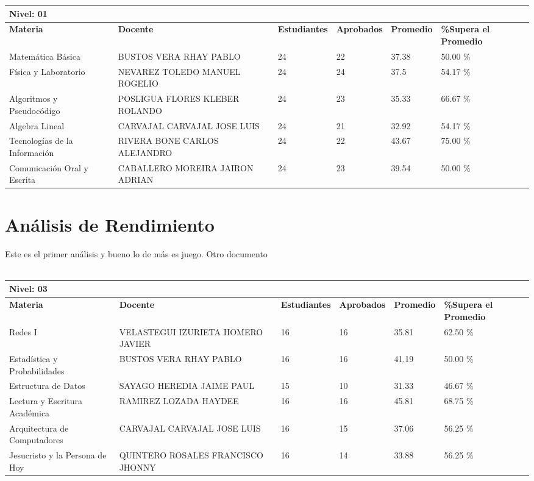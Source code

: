 \small
\begin{tabularx}{\textwidth}{|p{2.5cm}|p{2.5cm}|X|X|X|X|}
\hline
\multicolumn{6}{|X|}{\textbf{Nivel: 01 }}\\\hline\textbf{Materia} & \textbf{Docente} & \textbf{Estudiantes} & \textbf{Aprobados} & \textbf{Promedio} & \textbf{\%Supera el Promedio} \\ \hline
Matemática Básica & BUSTOS VERA RHAY PABLO & 24 & 22 & 37.38 & 50.00 \%\\ \hline
Física y Laboratorio & NEVAREZ TOLEDO MANUEL ROGELIO & 24 & 24 & 37.5 & 54.17 \%\\ \hline
Algoritmos y Pseudocódigo & POSLIGUA FLORES KLEBER ROLANDO & 24 & 23 & 35.33 & 66.67 \%\\ \hline
Algebra Lineal & CARVAJAL CARVAJAL JOSE LUIS & 24 & 21 & 32.92 & 54.17 \%\\ \hline
Tecnologías de la Información  & RIVERA BONE CARLOS ALEJANDRO & 24 & 22 & 43.67 & 75.00 \%\\ \hline
Comunicación Oral y Escrita & CABALLERO MOREIRA JAIRON ADRIAN & 24 & 23 & 39.54 & 50.00 \%\\ \hline
\end{tabularx}

\vspace{1cm}
\section{Análisis de Rendimiento}
Este es el primer análisis y bueno lo de más es juego.
Otro documento\\
\vspace{1cm}\\\small
\begin{tabularx}{\textwidth}{|p{2.5cm}|p{2.5cm}|X|X|X|X|}
\hline
\multicolumn{6}{|X|}{\textbf{Nivel: 03 }}\\\hline\textbf{Materia} & \textbf{Docente} & \textbf{Estudiantes} & \textbf{Aprobados} & \textbf{Promedio} & \textbf{\%Supera el Promedio} \\ \hline
Redes I & VELASTEGUI IZURIETA HOMERO JAVIER & 16 & 16 & 35.81 & 62.50 \%\\ \hline
Estadística y Probabilidades & BUSTOS VERA RHAY PABLO & 16 & 16 & 41.19 & 50.00 \%\\ \hline
Estructura de Datos & SAYAGO HEREDIA JAIME PAUL & 15 & 10 & 31.33 & 46.67 \%\\ \hline
Lectura y Escritura Académica & RAMIREZ LOZADA HAYDEE  & 16 & 16 & 45.81 & 68.75 \%\\ \hline
Arquitectura de Computadores & CARVAJAL CARVAJAL JOSE LUIS & 16 & 15 & 37.06 & 56.25 \%\\ \hline
Jesucristo y la Persona de Hoy & QUINTERO ROSALES FRANCISCO JHONNY & 16 & 14 & 33.88 & 56.25 \%\\ \hline
\end{tabularx}

